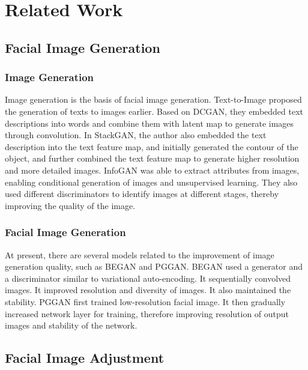 \section{Related Work}

\subsection{Facial Image Generation}

\subsubsection*{Image Generation}

Image generation is the basis of facial image generation.
Text-to-Image proposed the generation of texts to images earlier.
Based on DCGAN, they embedded text descriptions into words and combine them with latent map to generate images through convolution.
In StackGAN, the author also embedded the text description into the text feature map,
    and initially generated the contour of the object,
    and further combined the text feature map to generate higher resolution and more detailed images.
    InfoGAN was able to extract attributes from images, enabling conditional generation of images and unsupervised learning.
They also used different discriminators to identify images at different stages, thereby improving the quality of the image.


\subsubsection*{Facial Image Generation}

At present, there are several models related to the improvement of image generation quality,
    such as BEGAN and PGGAN.
BEGAN used a generator and a discriminator similar to variational auto-encoding.
It sequentially convolved images. It improved resolution and diversity of images. It also maintained the stability.
PGGAN first trained low-resolution facial image. It then gradually increased network layer for training, 
therefore improving resolution of output images and stability of the network.



\subsection{Facial Image Adjustment}

